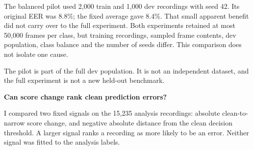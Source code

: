 \documentclass[10pt,a4paper]{article}
\newcommand{\reporttitle}[1]{{\color{navy}\Large\bfseries #1}\par\vspace{5pt}}
\begin{document}
The balanced pilot used 2,000 train and 1,000 dev recordings with seed 42. Its original EER was 8.8\%; the fixed average gave 8.4\%. That small apparent benefit did not carry over to the full experiment. Both experiments retained at most 50,000 frames per class, but training recordings, sampled frame contents, dev population, class balance and the number of seeds differ. This comparison does not isolate one cause.\par

{\small The pilot is part of the full dev population. It is not an independent dataset, and the full experiment is not a new held-out benchmark.}\par

\clearpage

\reporttitle{Can score change rank clean prediction errors?}

I compared two fixed signals on the 15,235 analysis recordings: absolute clean-to-narrow score change, and negative absolute distance from the clean decision threshold. A larger signal ranks a recording as more likely to be an error. Neither signal was fitted to the analysis labels.\par
\end{document}
